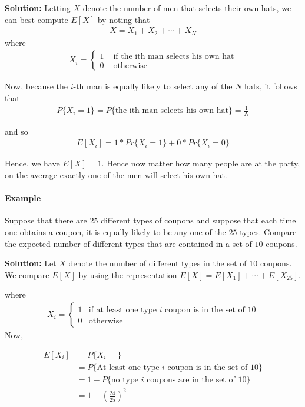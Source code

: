\documentclass[10 pt,final]{article}
\begin{document}
\textbf{Solution:} Letting $X$ denote the number of men that selects their own hats, we can best compute $E[X]$ by noting that 
\begin{align*}
X = X_1 + X_2 + \cdots + X_N
\end{align*}
where
\begin{align*}
X_i =
\begin{cases}
1 & \mbox{ if the ith man selects his own hat} \\
0 & \mbox{ otherwise}
\end{cases}
\end{align*}

Now, because the $i$-th man is equally likely to select any of the $N$ hats, it follows that 
\begin{align*}
P\{X_i=1\} = P\{\mbox{the ith man selects his own hat}\} = \frac{1}{N}
\end{align*}

and so 
\begin{align*}
E[X_i] = 1*Pr\{X_i = 1\} + 0 * Pr\{X_i = 0\}
\end{align*}

Hence, we have $E[X] = 1$. Hence now matter how many people are at the party, on the average exactly one of the men will select his own hat.



\paragraph{Example} Suppose that there are $25$ different types of coupons and suppose that each time one obtains a coupon, it is equally likely to be any one of the $25$ types. Compare the expected number of different types that are contained in a set of $10$ coupons. 

\textbf{Solution:} Let $X$ denote the number of different types in the set of $10$ coupons. We compare $E[X]$ by using the representation $E[X] = E[X_1] + \cdots + E[X_{25}]$.

where 
\begin{align*}
X_i =
\begin{cases}
1 & \mbox{if at least one type $i$ coupon is in the set of 10} \\
0 & \mbox{otherwise} 
\end{cases}
\end{align*}
Now,

\begin{align*}
E[X_i] & = P\{X_i = \} \\
& = P\{\mbox{At least one type $i$ coupon is in the set of $10$}\} \\
& = 1 - P\{\mbox{no type $i$ coupons are in the set of $10$}\} \\
& = 1 - (\frac{24}{25})^2
\end{align*}
\end{document}
